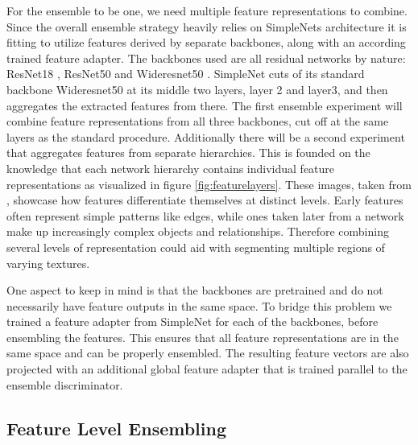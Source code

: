 For the ensemble to be one, we need multiple feature representations to combine. Since the overall ensemble strategy heavily relies on SimpleNets \cite{liu2023simplenet} architecture 
it is fitting to utilize features derived by separate backbones, along with an according trained feature adapter.\newline
The backbones used are all residual networks by nature: ResNet18 \cite{He_2016resnet}, ResNet50 \cite{He_2016resnet} and Wideresnet50 \cite{wideresnet}. SimpleNet cuts of its 
standard backbone Wideresnet50 at its middle two layers, layer 2 and layer3, and then aggregates the extracted features from there. The first ensemble experiment will combine 
feature representations from all three backbones, cut off at the same layers as the standard procedure. Additionally there will be a second experiment that aggregates features 
from separate hierarchies. This is founded on the knowledge that each network hierarchy contains individual feature representations as visualized in figure \ref{fig:featurelayers}. 
These images, taken from \cite{openaifeaturerepres}, showcase how features differentiate themselves at distinct levels. Early features often represent simple patterns like edges, 
while ones taken later from a network make up increasingly complex objects and relationships. Therefore combining several levels of representation could aid with segmenting 
multiple regions of varying textures.



One aspect to keep in mind is that the backbones are pretrained and do not necessarily have feature outputs in the same space. 
To bridge this problem we trained a feature adapter from SimpleNet for each of the backbones, before ensembling the features. 
This ensures that all feature representations are in the same space and can be properly ensembled. The resulting feature vectors are also projected with an additional global 
feature adapter that is trained parallel to the ensemble discriminator.


\subsection{Feature Level Ensembling}
\label{sec:featurelevelensemble}

